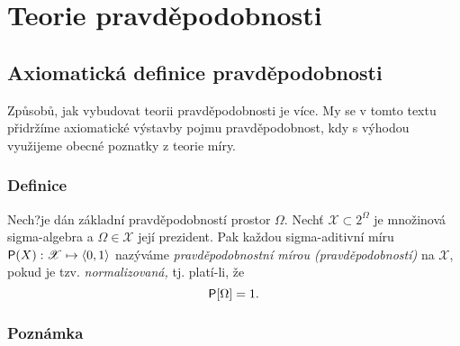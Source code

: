 \chapter{Teorie pravd\v epodobnosti}

\section{Axiomatick\'a definice pravd\v epodobnosti}

Zp\r usob\r u, jak vybudovat teorii pravd\v epodobnosti je v\'ice. My se v tomto textu p\v ridr\v z\'ime axiomatick\'e v\'ystavby pojmu pravd\v epodobnost, kdy s v\'yhodou vyu\v zijeme obecn\'e poznatky z teorie m\'iry.

\subsection{Definice}\label{prst}

Nech?je d\'an z\'akladn\'i pravd\v epodobnost\'i prostor $\Omega.$ Nech\v t
$\mathscr{X}\subset 2^{\Omega}$ je mno\v zinov\'a sigma-algebra a
$\Omega\in\mathscr{X}$ jej\'i prezident. Pak ka\v zdou sigma-aditivn\'i m\'iru
$\mbox{\sf P}(X): \mathscr{X} \mapsto \langle 0, 1\rangle$ nazýváme
\emph{pravděpodobnostn\'i m\'irou (pravděpodobností)} na $\mathscr{X}$, pokud je tzv.
\emph{normalizovan\'a,} tj. plat\'i-li, \v ze $$\mbox{\sf P}[\Omega] =1.$$

\subsection{Poznámka}

